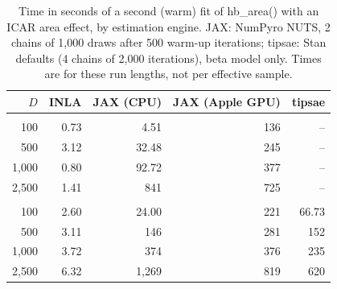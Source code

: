 \begin{table}[!h]
\centering
\caption{\label{tab:engines}Time in seconds of a second (warm) fit of hb\_area() with an ICAR area effect, by estimation engine. JAX: NumPyro NUTS, 2 chains of 1,000 draws after 500 warm-up iterations; tipsae: Stan defaults (4 chains of 2,000 iterations), beta model only. Times are for these run lengths, not per effective sample.}
\centering
\begin{tabular}[t]{rrrrr}
\toprule
$D$ & INLA & JAX (CPU) & JAX (Apple GPU) & tipsae\\
\midrule
\addlinespace[0.3em]
\multicolumn{5}{l}{\textbf{Gaussian}}\\
\hspace{1em}100 & 0.73 & 4.51 & 136 & --\\
\hspace{1em}500 & 3.12 & 32.48 & 245 & --\\
\hspace{1em}1,000 & 0.80 & 92.72 & 377 & --\\
\hspace{1em}2,500 & 1.41 & 841 & 725 & --\\
\addlinespace[0.3em]
\multicolumn{5}{l}{\textbf{Beta}}\\
\hspace{1em}100 & 2.60 & 24.00 & 221 & 66.73\\
\hspace{1em}500 & 3.11 & 146 & 281 & 152\\
\hspace{1em}1,000 & 3.72 & 374 & 376 & 235\\
\hspace{1em}2,500 & 6.32 & 1,269 & 819 & 620\\
\bottomrule
\end{tabular}
\end{table}

